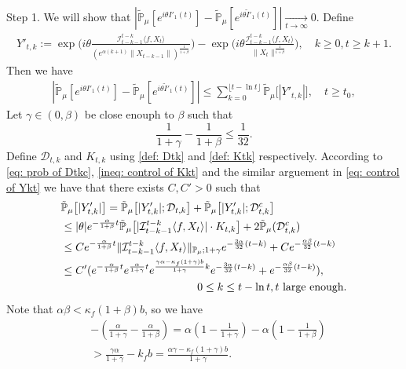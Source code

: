 \documentclass[12pt]{amsart}
\theoremstyle{plain}
\theoremstyle{definition}
\numberwithin{equation}{section}
\begin{document}
    Step 1. We will show that $|\mathbb{\tilde{P}}_{\mu}[e^{i\theta I'_1(t)}]-\mathbb{\tilde{P}}_{\mu}[e^{i\theta\tilde I'_1(t)}]|\xrightarrow[t\to \infty]{} 0$.
    Define
\begin{align*}
    Y'_{t,k}
    :=\exp\Big(i\theta\frac{\mathcal I_{t-k-1}^{t-k}\langle f ,X_t\rangle}{( e^{\alpha(k+1)}\|X_{t-k-1}\|)^{\frac{1}{1+\beta}}}\Big)-\exp\Big(i\theta\frac{\mathcal I_{t-k-1}^{t-k}\langle f ,X_t\rangle}{\|X_t\|^{\frac{1}{1+\beta}}}\Big),
    \quad k\geq 0, t\geq k+1.
\end{align*}
	Then we have 
\begin{align}
\label{ineq: control of I1t}
    |\mathbb{\tilde{P}}_{\mu}[e^{i\theta I'_1(t)}] - \mathbb{\tilde{P}}_{\mu} [e^{i\theta\tilde{I}'_1(t)}]|
    \leq \sum_{k=0}^{\lfloor t-\ln t \rfloor}\mathbb{\tilde{P}}_{\mu}\big[|Y'_{t,k}|\big],
    \quad t\geq t_0,
\end{align}
	Let $\gamma\in (0,\beta)$ be close enouph to $\beta$ such that
\[
	\frac{1}{1+\gamma} - \frac{1}{1+\beta} \leq \frac{1}{32}.
\]
	Define $\mathcal D_{t,k}$ and $K_{t,k}$ using \eqref{def: Dtk} and \eqref{def: Ktk} respectively.
	According to \eqref{eq: prob of Dtkc}, \eqref{ineq: control of Kkt} and the similar arguement in \eqref{eq: control of Ykt} we have that there exists $C,C'>0$ such that
\begin{align*}
    &\mathbb{\tilde{P}}_{\mu}\big[|Y'_{t,k}|\big]
    = \mathbb{\tilde{P}}_{\mu}\big[|Y'_{t,k}|; \mathcal D_{t,k}\big] + \mathbb{\tilde{P}}_{\mu}\big[|Y'_{t,k}|; \mathcal D_{t,k}^c \big]
    \\& \leq |\theta| e^{-\frac{\alpha}{1+\beta} t}\mathbb{\tilde{P}}_{\mu}\big[|\mathcal I_{t-k-1}^{t-k}\langle f ,X_t\rangle|\cdot K_{t,k}\big] + 2\mathbb{\tilde{P}}_{\mu}( \mathcal D_{t,k}^c )
    \\& \leq C e^{-\frac{\alpha}{1+\beta} t} \|\mathcal I_{t-k-1}^{t-k}\langle f, X_t\rangle \|_{\mathbb P_\mu; 1+\gamma}e^{-\frac{3\alpha}{32}(t-k)} + Ce^{-\frac{\alpha \beta}{32}(t-k)}
    \\& \leq C'( e^{-\frac{\alpha}{1+\beta}t}e^{\frac{\alpha}{1+\gamma}t}e^{\frac{\gamma \alpha-\kappa_f(1+\gamma)b}{1+\gamma}k}e^{-\frac{3\alpha}{32}(t-k)}+ e^{-\frac{\alpha \beta}{32}(t-k)}),
    \\&& \mathllap{\quad 0 \leq k \leq t - \ln t, t \text{ large enough}.}
\end{align*}
	Note that $\alpha\beta<\kappa_f(1+\beta)b$, so we have  
\begin{align}
\label{eq: condition for supercritical}
	&-(\frac{\alpha}{1+\gamma}-\frac{\alpha}{1+\beta})
    = \alpha(1-\frac{1}{1+\gamma}) - \alpha(1-\frac{1}{1+\beta})
    \\&> \frac{\gamma \alpha}{1+\gamma} - k_f b
    =\frac{\alpha \gamma-\kappa_f(1+\gamma)b}{1+\gamma}.
\end{align}
\end{document}
